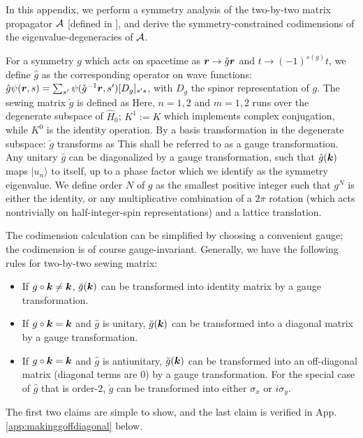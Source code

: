 \documentclass[aps, showpacs, twocolumn, notitlepage, superscriptaddress]{revtex4-1}
\begin{document}
In this appendix, we perform a symmetry analysis of the two-by-two matrix  propagator ${\cal A}$  [defined in ], and derive the symmetry-constrained codimensions of the eigenvalue-degeneracies of ${\cal A}$.

For a symmetry $g$ which acts on spacetime as $\boldsymbol{r} \rightarrow \check{g} \boldsymbol{r}$ and $t\rightarrow (-1)^{s(g)}t$, 
we define $\hat{g}$ as the corresponding operator  on wave functions: $\hat{g} \psi(\boldsymbol{r},s)=\sum_{s'}\psi(\check{g}^{-1} \boldsymbol{r},s')[D_g]_{s's}$, with $D_g$ the spinor representation of $g$. The sewing matrix $\breve{g}$ is defined as 
Here, $n=1,2$ and $m=1,2$ runs over the degenerate subspace of $\hat{H}_0$; $K^1:=K$ which implements complex conjugation, while $K^0$ is the identity operation. By a basis transformation in the degenerate subspace: 
$\breve{g}$ transforms as
This shall be referred to as a gauge transformation.
Any unitary $\hat{g}$ can be diagonalized by a gauge transformation, such that  $\hat{g}(\boldsymbol{k})$ maps $|u_n\rangle$ to itself, up to a phase factor which we identify as the symmetry eigenvalue. We define order $N$ of $g$ as the smallest positive integer such that $g^N$ is either the identity, or any multiplicative combination of  a $2\pi$ rotation (which acts nontrivially on half-integer-spin representations) and a lattice translation.

The codimension calculation can be  simplified by choosing a convenient gauge; the codimension is of course gauge-invariant. Generally, we have the following rules for two-by-two sewing matrix:
\begin{itemize}
\item If $g\circ\boldsymbol{k}\ne\boldsymbol{k}$, $\breve{g}(\boldsymbol{k})$ can be transformed into identity matrix by a gauge transformation.
\item If $g\circ\boldsymbol{k}=\boldsymbol{k}$ and $\hat{g}$ is unitary, $\breve{g}(\boldsymbol{k})$ can be transformed into a diagonal matrix by a gauge transformation.
\item If $g\circ\boldsymbol{k}=\boldsymbol{k}$ and $\hat{g}$ is antiunitary, $\breve{g}(\boldsymbol{k})$ can be transformed into an off-diagonal matrix (diagonal terms are 0) by a gauge transformation.  For the special case of $\hat{g}$ that is order-2, $\breve{g}$ can be transformed into either $\sigma_x$  or $i\sigma_y$.
\end{itemize}
The first two claims are simple to show, and the last claim is verified  in App. \ref{app:makinggoffdiagonal} below.
\end{document}

